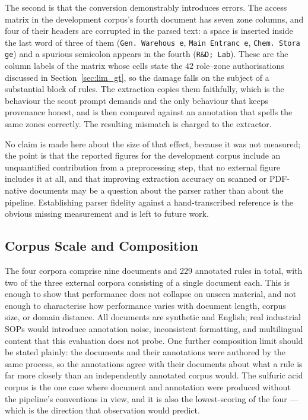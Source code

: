 \documentclass[11pt]{article}
\begin{document}
The second is that the conversion demonstrably introduces errors. The access
matrix in the development corpus's fourth document has seven zone columns, and
four of their headers are corrupted in the parsed text: a space is inserted
inside the last word of three of them (\texttt{Gen.\ Warehous e},
\texttt{Main Entranc e}, \texttt{Chem.\ Stora ge}) and a spurious semicolon
appears in the fourth (\texttt{R\&D; Lab}). These are the column labels of the
matrix whose cells state the $42$ role--zone authorisations discussed in
Section~\ref{sec:lim_gt}, so the damage falls on the subject of a substantial
block of rules. The extraction copies them faithfully, which is the behaviour
the scout prompt demands and the only behaviour that keeps provenance honest,
and is then compared against an annotation that spells the same zones correctly.
The resulting mismatch is charged to the extractor.

No claim is made here about the size of that effect, because it was not
measured; the point is that the reported figures for the development corpus
include an unquantified contribution from a preprocessing step, that no external
figure includes it at all, and that improving extraction accuracy on scanned or
PDF-native documents may be a question about the parser rather than about the
pipeline. Establishing parser fidelity against a hand-transcribed reference is
the obvious missing measurement and is left to future work.

\subsection{Corpus Scale and Composition}
\label{sec:lim_scale}
The four corpora comprise nine documents and 229 annotated rules in total, with
two of the three external corpora consisting of a single document each. This is
enough to show that performance does not collapse on unseen material, and not
enough to characterise how performance varies with document length, corpus size,
or domain distance. All documents are synthetic and English; real industrial SOPs
would introduce annotation noise, inconsistent formatting, and multilingual
content that this evaluation does not probe. One further composition limit
should be stated plainly: the documents and their annotations were authored by
the same process, so the annotations agree with their documents about what a
rule is far more closely than an independently annotated corpus would. The
sulfuric acid corpus is the one case where document and annotation were produced
without the pipeline's conventions in view, and it is also the lowest-scoring of
the four --- which is the direction that observation would predict.
\end{document}
